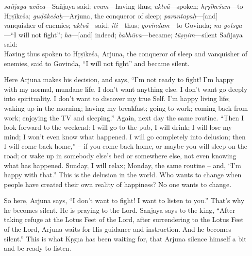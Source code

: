 {%
  \textit{sañjaya uvāca}---Sañjaya said; 
  \textit{evam}---having thus; 
  \textit{uktvā}---spoken; 
  \textit{hṛṣīkeśam}---to Hṛṣīkeśa; 
  \textit{guḍākeśaḥ}---Arjuna, the conqueror of sleep; 
  \textit{parantapaḥ}---[and] vanquisher of enemies; 
  \textit{uktvā}---said; 
  \textit{iti}---thus; 
  \textit{govindam}---to Govinda; 
  \textit{na yotsya}---\enquote{I will not fight}; 
  \textit{ha}---[and] indeed; 
  \textit{babhūva}---became; 
  \textit{tūṣṇim}---silent
}
{%
  \hspace*{1em}Sañjaya said: \\
  Having thus spoken to Hṛṣīkeśa, Arjuna, the conqueror of sleep and vanquisher of enemies, said to Govinda, \enquote{I will not fight} and became silent.
}

Here Arjuna makes his decision, and says, “I’m not ready to fight! I’m happy with my normal, mundane life. I don’t want anything else. I don’t want go deeply into spirituality. I don’t want to discover my true Self. I’m happy living life; waking up in the morning; having my breakfast; going to work; coming back from work; enjoying the TV and sleeping.” Again, next day the same routine. “Then I look forward to the weekend: I will go to the pub, I will drink; I will lose my mind; I won’t even know what happened. I will go completely into delusion; then I will come back home,” – if you come back home, or maybe you will sleep on the road; or wake up in somebody else’s bed or somewhere else, not even knowing what has happened. Sunday, I will relax; Monday, the same routine – and, “I’m happy with that.” This is the delusion in the world. Who wants to change when people have created their own reality of happiness? No one wants to change.

So here, Arjuna says, “I don’t want to fight! I want to listen to you.” That’s why he becomes silent. He is praying to the Lord. Sanjaya says to the king, “After taking refuge at the Lotus Feet of the Lord, after surrendering to the Lotus Feet of the Lord, Arjuna waits for His guidance and instruction. And he becomes silent.” This is what Kṛṣṇa has been waiting for, that Arjuna silence himself a bit and be ready to listen.

